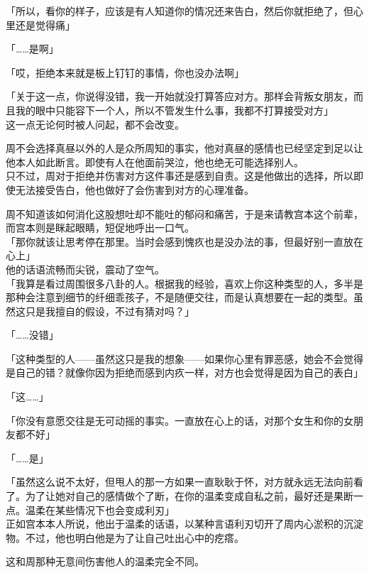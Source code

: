 「所以，看你的样子，应该是有人知道你的情况还来告白，然后你就拒绝了，但心里还是觉得痛」

「……是啊」

「哎，拒绝本来就是板上钉钉的事情，你也没办法啊」

「关于这一点，你说得没错，我一开始就没打算答应对方。那样会背叛女朋友，而且我的眼中只能容下一个人，所以不管发生什么事，我都不打算接受对方」\\

这一点无论何时被人问起，都不会改变。

周不会选择真昼以外的人是众所周知的事实，他对真昼的感情也已经坚定到足以让他本人如此断言。即使有人在他面前哭泣，他也绝无可能选择别人。\\

只不过，周对于拒绝并伤害对方这件事还是感到自责。这是他做出的选择，所以即使无法接受告白，他也做好了会伤害到对方的心理准备。

周不知道该如何消化这股想吐却不能吐的郁闷和痛苦，于是来请教宫本这个前辈，而宫本则是眯起眼睛，短促地呼出一口气。\\

「那你就该让思考停在那里。当时会感到愧疚也是没办法的事，但最好别一直放在心上」\\

他的话语流畅而尖锐，震动了空气。\\

「我算是看过周围很多八卦的人。根据我的经验，喜欢上你这种类型的人，多半是那种会注意到细节的纤细乖孩子，不是随便交往，而是认真想要在一起的类型。虽然这只是我擅自的假设，不过有猜对吗？」

「……没错」

「这种类型的人——虽然这只是我的想象——如果你心里有罪恶感，她会不会觉得是自己的错？就像你因为拒绝而感到内疚一样，对方也会觉得是因为自己的表白」

「这……」

「你没有意愿交往是无可动摇的事实。一直放在心上的话，对那个女生和你的女朋友都不好」

「……是」

「虽然这么说不太好，但甩人的那一方如果一直耿耿于怀，对方就永远无法向前看了。为了让她对自己的感情做个了断，在你的温柔变成自私之前，最好还是果断一点。温柔在某些情况下也会变成利刃」\\

正如宫本本人所说，他出于温柔的话语，以某种言语利刃切开了周内心淤积的沉淀物。不过，他也明白他是为了让自己吐出心中的疙瘩。

这和周那种无意间伤害他人的温柔完全不同。

